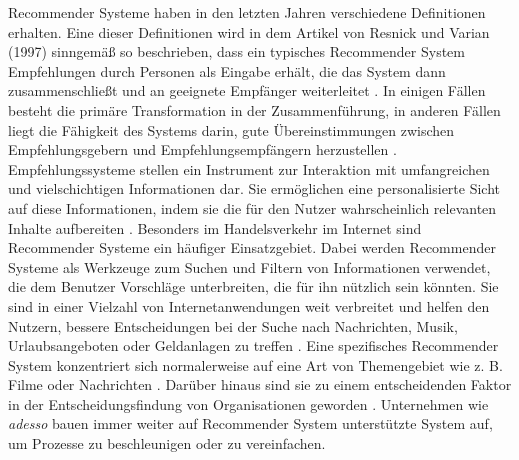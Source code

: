 Recommender Systeme haben in den letzten Jahren verschiedene Definitionen erhalten. Eine dieser Definitionen wird in dem Artikel von Resnick und Varian (1997) sinngemäß so beschrieben, dass ein typisches Recommender System Empfehlungen durch Personen als Eingabe erhält, die das System dann zusammenschließt und an geeignete Empfänger weiterleitet \cite{burke2011recommender}. In einigen Fällen besteht die primäre Transformation in der Zusammenführung, in anderen Fällen liegt die Fähigkeit des Systems darin, gute Übereinstimmungen zwischen Empfehlungsgebern und Empfehlungsempfängern herzustellen \cite{burke2011recommender}. Empfehlungssysteme stellen ein Instrument zur Interaktion mit umfangreichen und vielschichtigen Informationen dar. Sie ermöglichen eine personalisierte Sicht auf diese Informationen, indem sie die für den Nutzer wahrscheinlich relevanten Inhalte aufbereiten \cite{burke2011recommender}. Besonders im Handelsverkehr im Internet sind Recommender Systeme ein häufiger Einsatzgebiet. Dabei werden Recommender Systeme als Werkzeuge zum Suchen und Filtern von Informationen verwendet, die dem Benutzer Vorschläge unterbreiten, die für ihn nützlich sein könnten. Sie sind in einer Vielzahl von Internetanwendungen weit verbreitet und helfen den Nutzern, bessere Entscheidungen bei der Suche nach Nachrichten, Musik, Urlaubsangeboten oder Geldanlagen zu treffen \cite{ricci2014recommender}. Eine spezifisches Recommender System konzentriert sich normalerweise auf eine Art von Themengebiet wie z. B. Filme oder Nachrichten \cite{ricci2014recommender}. Darüber hinaus sind sie zu einem entscheidenden Faktor in der Entscheidungsfindung von Organisationen geworden \cite{chartron2014general}. Unternehmen wie \emph{adesso} bauen immer weiter auf Recommender System unterstützte System auf, um Prozesse zu beschleunigen oder zu vereinfachen.\\

